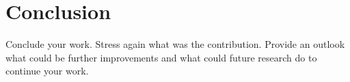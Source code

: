 \chapter{Conclusion} \label{sec:conclusion}

Conclude your work. Stress again what was the contribution. 
Provide an outlook what could be further improvements and what could future research do to continue your work.

\newpage